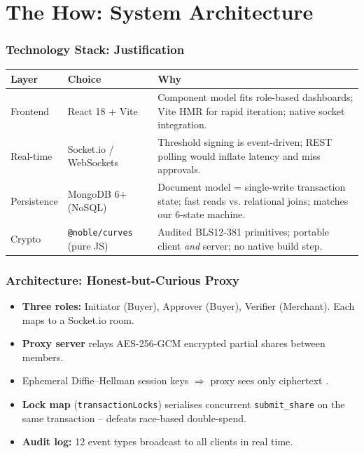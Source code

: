 \documentclass{beamer}
\newcommand{\pos}[1]{\textcolor{positive}{#1}}
\newcommand{\HL}[1]{\textcolor{emphasis}{#1}}
\begin{document}
\section{The How: System Architecture}

\begin{frame}
  \frametitle{Technology Stack: Justification}
  \begin{center}
  \small
  \begin{tabular}{|p{}|p{}|p{}|}
    \hline
    \textbf{Layer} & \textbf{Choice} & \textbf{Why} \\\hline
    Frontend & React 18 + Vite & Component model fits role-based dashboards; Vite HMR for rapid iteration; native socket integration. \\\hline
    Real-time & Socket.io / WebSockets & Threshold signing is \HL{event-driven}; REST polling would inflate latency and miss approvals. \\\hline
    Persistence & MongoDB 6+ (NoSQL) & Document model = single-write transaction state; fast reads vs. relational joins; matches our 6-state machine. \\\hline
    Crypto & \texttt{@noble/curves} (pure JS) & Audited BLS12-381 primitives; portable client \emph{and} server; no native build step. \\\hline
  \end{tabular}
  \end{center}
\end{frame}

\begin{frame}
  \frametitle{Architecture: Honest-but-Curious Proxy}
  \begin{itemize}
      \item \textbf{Three roles:} \pos{Initiator} (Buyer), \pos{Approver} (Buyer), \pos{Verifier} (Merchant). Each maps to a Socket.io room.
      \item \textbf{Proxy server} relays AES-256-GCM encrypted partial shares between members.
      \item Ephemeral Diffie--Hellman session keys $\Rightarrow$ proxy sees \HL{only ciphertext} \cite{chen2011, ruffing2014}.
      \item \textbf{Lock map} (\texttt{transactionLocks}) serialises concurrent \texttt{submit\_share} on the same transaction -- defeats race-based double-spend.
      \item \textbf{Audit log:} 12 event types broadcast to all clients in real time.
  \end{itemize}
\end{frame}
\end{document}
